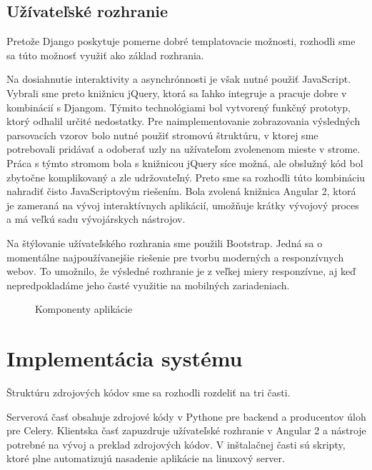 \subsection{Užívateľské rozhranie}
Pretože Django poskytuje pomerne dobré templatovacie možnosti, rozhodli sme sa túto možnosť využiť ako základ rozhrania.
\par Na dosiahnutie interaktivity a asynchrónnosti je však nutné použiť JavaScript. Vybrali sme preto knižnicu jQuery, ktorá sa ľahko integruje a pracuje dobre v kombinácií s Djangom. Týmito technológiami bol vytvorený funkčný prototyp, ktorý odhalil určité nedostatky. Pre naimplementovanie zobrazovania výsledných parsovacích vzorov bolo nutné použiť stromovú štruktúru, v ktorej sme potrebovali pridávať a odoberať uzly na užívateľom zvolenenom mieste v strome. Práca s týmto stromom bola s knižnicou jQuery síce možná, ale obslužný kód bol zbytočne komplikovaný a zle udržovateľný. Preto sme sa rozhodli túto kombináciu nahradiť čisto JavaScriptovým riešením. Bola zvolená knižnica Angular 2, ktorá je zameraná na vývoj interaktívnych aplikácií, umožňuje krátky vývojový proces a má veľkú sadu vývojárskych nástrojov.
\par Na štýlovanie užívateľského rozhrania sme použili Bootstrap. Jedná sa o momentálne najpoužívanejšie riešenie pre tvorbu moderných a responzívnych webov. To umožnilo, že výsledné rozhranie je z veľkej miery responzívne, aj keď nepredpokladáme jeho časté využitie na mobilných zariadeniach.

\begin{figure}[htbp]
 \centering 
 \begin{minipage}{0.95\linewidth}
 	\centering
 \end{minipage}
  \caption{Komponenty aplikácie }
  \label{fig:components}
\end{figure}

\section{Implementácia systému}
Štruktúru zdrojových kódov sme sa rozhodli rozdeliť na tri časti.
\par Serverová časť obsahuje zdrojové kódy v Pythone pre backend a producentov úloh pre Celery. Klientska časť zapuzdruje užívateľské rozhranie v Angular 2 a nástroje potrebné na vývoj a preklad zdrojových kódov. V inštalačnej časti sú skripty, ktoré plne automatizujú nasadenie aplikácie na linuxový server.